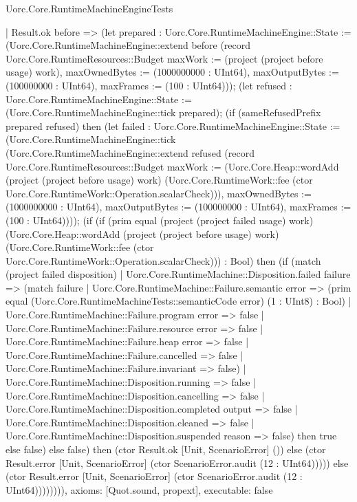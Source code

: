 \begin{lexlean}{Uorc.Core.RuntimeMachineEngineTests}
\begin{semanticmodule}
{      | Result.ok before => (let prepared : Uorc.Core.RuntimeMachineEngine::State := (Uorc.Core.RuntimeMachineEngine::extend before (record Uorc.Core.RuntimeResources::Budget {maxWork := (project (project before usage) work), maxOwnedBytes := (1000000000 : UInt64), maxOutputBytes := (100000000 : UInt64), maxFrames := (100 : UInt64)})); (let refused : Uorc.Core.RuntimeMachineEngine::State := (Uorc.Core.RuntimeMachineEngine::tick prepared); (if (sameRefusedPrefix prepared refused) then (let failed : Uorc.Core.RuntimeMachineEngine::State := (Uorc.Core.RuntimeMachineEngine::tick (Uorc.Core.RuntimeMachineEngine::extend refused (record Uorc.Core.RuntimeResources::Budget {maxWork := (Uorc.Core.Heap::wordAdd (project (project before usage) work) (Uorc.Core.RuntimeWork::fee (ctor Uorc.Core.RuntimeWork::Operation.scalarCheck))), maxOwnedBytes := (1000000000 : UInt64), maxOutputBytes := (100000000 : UInt64), maxFrames := (100 : UInt64)}))); (if (if (prim equal (project (project failed usage) work) (Uorc.Core.Heap::wordAdd (project (project before usage) work) (Uorc.Core.RuntimeWork::fee (ctor Uorc.Core.RuntimeWork::Operation.scalarCheck))) : Bool) then (if (match (project failed disposition)
        | Uorc.Core.RuntimeMachine::Disposition.failed failure => (match failure
          | Uorc.Core.RuntimeMachine::Failure.semantic error => (prim equal (Uorc.Core.RuntimeMachineTests::semanticCode error) (1 : UInt8) : Bool)
          | Uorc.Core.RuntimeMachine::Failure.program error => false
          | Uorc.Core.RuntimeMachine::Failure.resource error => false
          | Uorc.Core.RuntimeMachine::Failure.heap error => false
          | Uorc.Core.RuntimeMachine::Failure.cancelled => false
          | Uorc.Core.RuntimeMachine::Failure.invariant => false)
        | Uorc.Core.RuntimeMachine::Disposition.running => false
        | Uorc.Core.RuntimeMachine::Disposition.cancelling => false
        | Uorc.Core.RuntimeMachine::Disposition.completed output => false
        | Uorc.Core.RuntimeMachine::Disposition.cleaned => false
        | Uorc.Core.RuntimeMachine::Disposition.suspended reason => false) then true else false) else false) then (ctor Result.ok [Unit, ScenarioError] ()) else (ctor Result.error [Unit, ScenarioError] (ctor ScenarioError.audit (12 : UInt64))))) else (ctor Result.error [Unit, ScenarioError] (ctor ScenarioError.audit (12 : UInt64)))))))),
  axioms: [Quot.sound, propext],
  executable: false
}


\end{semanticmodule}
\end{lexlean}
